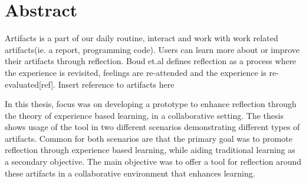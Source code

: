 \chapter{Abstract}
Artifacts is a part of our daily routine, interact and work with work related artifacts(ie. a report, programming code). Users can learn more about or improve their artifacts through reflection. Boud et.al defines reflection as a process where the experience is revisited, feelings are re-attended and the experience is re-evaluated[ref]. 
Insert reference to artifacts here

In this thesis, focus was on developing a prototype to enhance reflection through the theory of experience based learning, in a collaborative setting. The thesis shows usage of the tool in two different scenarios demonstrating different types of artifacts. Common for both scenarios are that the primary goal was to promote reflection through experience based learning, while aiding traditional learning as a secondary objective. 
The main objective was to offer a tool for reflection around these artifacts in a collaborative environment that enhances learning. 
